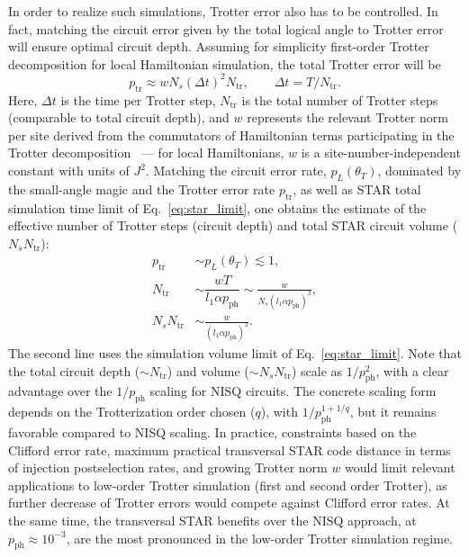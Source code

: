 \documentclass[aps, prx, reprint, superscriptaddress, longbibliography, floatfix]{revtex4-2}
\begin{document}
In order to realize such simulations, Trotter error also has to be controlled. In fact, matching the circuit error given by the total logical angle to Trotter error will ensure optimal circuit depth. Assuming for simplicity first-order Trotter decomposition for local Hamiltonian simulation, the total Trotter error will be 
\begin{equation}
p_{\mathrm{tr}} \approx wN_s(\Delta t)^2 N_{\mathrm{tr}}, \qquad 
\Delta t =T/N_{\mathrm{tr}}.
\end{equation}
Here, $\Delta t$ is the time per Trotter step, $N_{\mathrm{tr}}$ is the total number of Trotter steps (comparable to total circuit depth), and $w$ represents the relevant Trotter norm per site derived from the commutators of Hamiltonian terms participating in the Trotter decomposition~\cite{Campbell2019} --- for local Hamiltonians, $w$ is a site-number-independent constant with units of $J^2$. Matching the circuit error rate, $p_L(\theta_T)$, dominated by the small-angle magic and the Trotter error rate $p_{\mathrm{tr}}$, as well as STAR total simulation time limit of Eq.~\eqref{eq:star_limit}, one obtains the estimate of the effective number of Trotter steps (circuit depth) and total STAR circuit volume ($N_s N_{\mathrm{tr}}$):
\begin{align}\label{eq:star_depth_volume_larged}
    p_{\mathrm{tr}} & \sim  p_L(\theta_T) \lesssim 1,  
     \nonumber \\
    N_{\mathrm{tr}} & \sim \dfrac{w T}{l_1\alpha p_{\mathrm{ph}}}  \sim \frac{w}{N_s\left(l_1\alpha p_{\mathrm{ph}}\right)^2}, \\
    N_s N_{\mathrm{tr}}&  \sim \frac{w}{\left(l_1\alpha p_{\mathrm{ph}}\right)^2}.
\end{align}
The second line uses the simulation volume limit of Eq.~\eqref{eq:star_limit}. Note that the total circuit depth ($\sim N_{\mathrm{tr}}$) and volume ($\sim N_s  N_{\mathrm{tr}}$) scale as $1/p_{\mathrm{ph}}^2$, with a clear advantage over the $1/p_{\mathrm{ph}}$ scaling for NISQ circuits. The concrete scaling form depends on the Trotterization order chosen ($q$), with $1/p_{\mathrm{ph}}^{1+1/q}$, but it remains favorable compared to NISQ scaling. In practice, constraints based on the Clifford error rate, maximum practical transversal STAR code distance in terms of injection postselection rates, and growing Trotter norm $w$ would limit relevant applications to low-order Trotter simulation (first and second order Trotter), as further decrease of Trotter errors would compete against Clifford error rates. At the same time, the transversal STAR benefits over the NISQ approach, at $p_{\mathrm{ph}}\approx 10^{-3}$, are the most pronounced in the low-order Trotter simulation regime.
\end{document}
